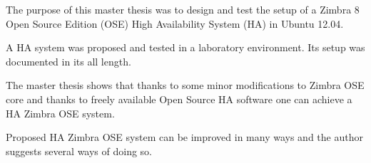 %
%
%

\noindent       %
The purpose of this master thesis was to design and test the setup of a Zimbra 8 Open Source Edition (OSE) High Availability System (HA) in Ubuntu 12.04.


\vspace*{0.5em}
\noindent       %
A HA system was proposed and tested in a laboratory environment. Its setup was documented in its all length.

\vspace*{0.5em}
\noindent       %
The master thesis shows that thanks to some minor modifications to Zimbra OSE core and thanks to freely available Open Source HA software one can achieve a HA Zimbra OSE system.

\vspace*{0.5em}
\noindent       %
Proposed HA Zimbra OSE system can be improved in many ways and the author suggests several ways of doing so.
